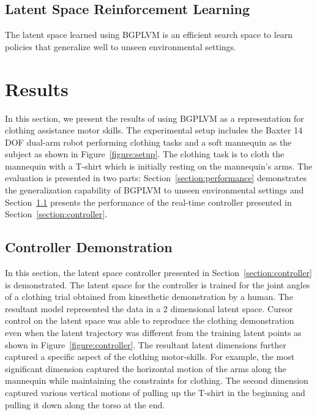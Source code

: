 \documentclass{article}
\begin{document}
\subsection{Latent Space Reinforcement Learning}
\label{section:latentspace}

The latent space learned using BGPLVM is an efficient search space to learn policies that generalize well to unseen environmental settings. 

\section{Results}
\label{section:results}

In this section, we present the results of using BGPLVM as a representation for clothing assistance motor skills. The experimental setup includes the Baxter 14 DOF dual-arm robot performing clothing tasks and a soft mannequin as the subject as shown in Figure~\ref{figure:setup}. The clothing task is to cloth the mannequin with a T-shirt which is initially resting on the mannequin's arms. The evaluation is presented in two parts: Section~\ref{section:performance} demonstrates the generalization capability of BGPLVM to unseen environmental settings and Section~\ref{section:controllerres} presents the performance of the real-time controller presented in Section~\ref{section:controller}.

\subsection{Controller Demonstration}
\label{section:controllerres}

In this section, the latent space controller presented in Section~\ref{section:controller} is demonstrated. The latent space for the controller is trained for the joint angles of a clothing trial obtained from kinesthetic demonstration by a human. The resultant model represented the data in a 2 dimensional latent space. Cursor control on the latent space was able to reproduce the clothing demonstration even when the latent trajectory was different from the training latent points as shown in Figure~\ref{figure:controller}. The resultant latent dimensions further captured a specific aspect of the clothing motor-skills. For example, the most significant dimension captured the horizontal motion of the arms along the mannequin while maintaining the constraints for clothing. The second dimension captured various vertical motions of pulling up the T-shirt in the beginning and pulling it down along the torso at the end.
\end{document}
